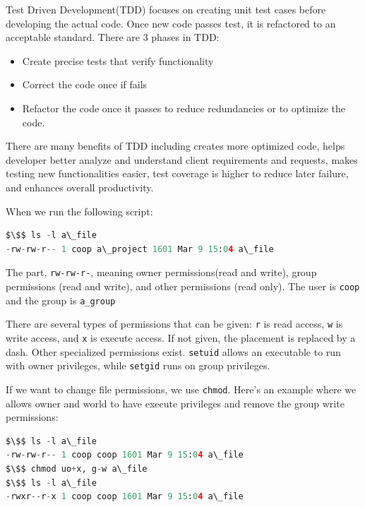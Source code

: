 \documentclass[11pt]{article}
\begin{document}
\noindent Test Driven Development(TDD) focuses on creating unit test cases before developing the actual code. Once new code passes test, it is refactored to an acceptable standard. There are 3 phases in TDD:

\begin{itemize}
    \item Create precise tests that verify functionality
    \item Correct the code once if fails
    \item Refactor the code once it passes to reduce redundancies or to optimize the code.
\end{itemize}

\noindent There are many benefits of TDD including creates more optimized code, helps developer better analyze and understand client requirements and requests, makes testing new functionalities easier, test coverage is higher to reduce later failure, and enhances overall productivity.

\noindent When we run the following script:
\begin{lstlisting}[language=python, mathescape=true]
$\$$ ls -l a\_file
-rw-rw-r-- 1 coop a\_project 1601 Mar 9 15:04 a\_file
\end{lstlisting}

\noindent The part, \texttt{rw-rw-r-}, meaning owner permissions(read and write), group permissions (read and write), and other permissions (read only). The user is \texttt{coop} and the group is \texttt{a\_group}

\noindent There are several types of permissions that can be given: \texttt{r} is read access, \texttt{w} is write access, and \texttt{x} is execute access. If not given, the placement is replaced by a dash. Other specialized permissions exist. \texttt{setuid} allows an executable to run with owner privileges, while \texttt{setgid} runs on group privileges.


\noindent If we want to change file permissions, we use \texttt{chmod}. Here's an example where we allows owner and world to have execute privileges and remove the group write permissions:
\begin{lstlisting}[language=python, mathescape=true]
$\$$ ls -l a\_file
-rw-rw-r-- 1 coop coop 1601 Mar 9 15:04 a\_file
$\$$ chmod uo+x, g-w a\_file
$\$$ ls -l a\_file
-rwxr--r-x 1 coop coop 1601 Mar 9 15:04 a\_file
\end{lstlisting}
\end{document}
